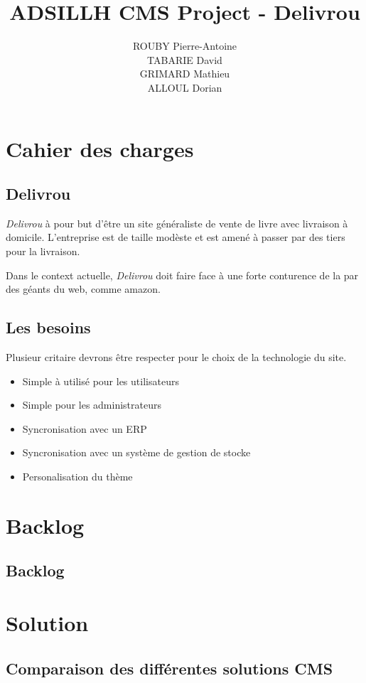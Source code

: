 \documentclass[a4paper,12pt]{report}
\title{ADSILLH CMS Project - Delivrou}
\author{ROUBY Pierre-Antoine \\ TABARIE David \\ GRIMARD Mathieu \\
  ALLOUL Dorian}
\begin{document}
\maketitle
\tableofcontents

\part{Cahier des charges}
\chapter{Delivrou}
\textit{Delivrou} à pour but d'être un site généraliste de vente de livre
avec livraison à domicile. L'entreprise est de taille modèste et est amené
à passer par des tiers pour la livraison.

Dans le context actuelle, \textit{Delivrou} doit faire face à une forte
conturence de la par des géants du web, comme amazon.

\chapter{Les besoins}
Plusieur critaire devrons être respecter pour le choix de la technologie du
site.
\begin{itemize}
\item Simple à utilisé pour les utilisateurs
\item Simple pour les administrateurs
\item Syncronisation avec un ERP
\item Syncronisation avec un système de gestion de stocke
\item Personalisation du thème
\end{itemize}

\part{Backlog}
\chapter{Backlog}

\part{Solution}
\chapter{Comparaison des différentes solutions CMS}
\end{document}
